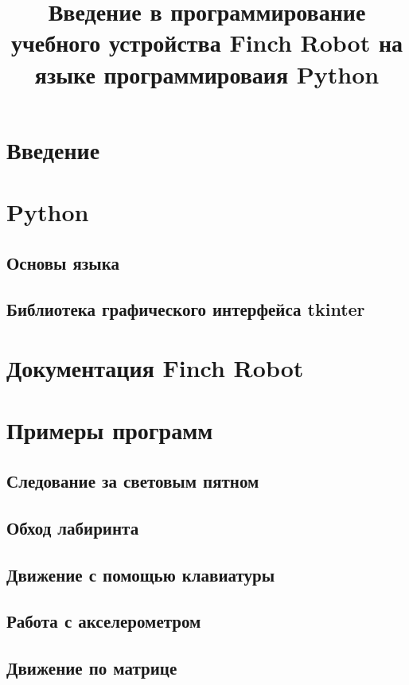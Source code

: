 \documentclass[a4papper, 12pt]{report}
\title {Введение в программирование учебного устройства Finch Robot на
  языке программироваия Python}
\date{}
\begin{document}
\maketitle

\chapter*{Введение}

\tableofcontents

\chapter{Python}

\section{Основы языка}

\section{Библиотека графического интерфейса tkinter}

\chapter{Документация Finch Robot}

\chapter{Примеры программ}

\section{Следование за световым пятном}

\section{Обход лабиринта}

\section{Движение с помощью клавиатуры}

\section{Работа с акселерометром}

\section{Движение по матрице}
\end{document}
